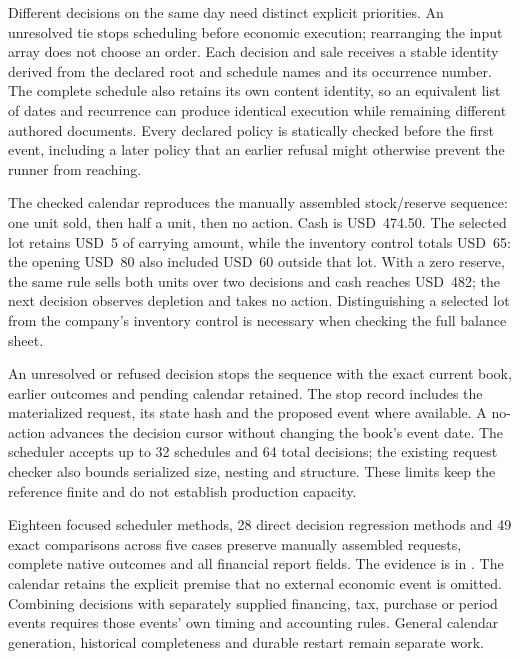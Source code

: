 Different decisions on the same day need distinct explicit priorities. An
unresolved tie stops scheduling before economic execution; rearranging the input
array does not choose an order. Each decision and sale receives a stable identity
derived from the declared root and schedule names and its occurrence number.
The complete schedule also retains its own content identity, so an equivalent
list of dates and recurrence can produce identical execution while remaining
different authored documents. Every declared policy is statically checked
before the first event, including a later policy that an earlier refusal might
otherwise prevent the runner from reaching.

The checked calendar reproduces the manually assembled stock/reserve sequence:
one unit sold, then half a unit, then no action. Cash is USD~474.50. The selected
lot retains USD~5 of carrying amount, while the inventory control totals USD~65:
the opening USD~80 also included USD~60 outside that lot. With a zero reserve,
the same rule sells both units over two decisions and cash reaches USD~482;
the next decision observes depletion and takes no action. Distinguishing a
selected lot from the company's inventory control is necessary when checking
the full balance sheet.

An unresolved or refused decision stops the sequence with the exact current
book, earlier outcomes and pending calendar retained. The stop record includes
the materialized request, its state hash and the proposed event where available.
A no-action advances the decision cursor without changing the book's event
date. The scheduler accepts up to 32 schedules and 64 total decisions; the
existing request checker also bounds serialized size, nesting and structure.
These limits keep the reference finite and do not establish production capacity.

Eighteen focused scheduler methods, 28 direct decision regression methods and
49 exact comparisons across five cases preserve manually assembled requests,
complete native outcomes and all financial report fields. The evidence is in
. The calendar
retains the explicit premise that no external economic event is omitted.
Combining decisions with separately supplied financing, tax, purchase or period
events requires those events' own timing and accounting rules. General calendar
generation, historical completeness and durable restart remain separate work.


